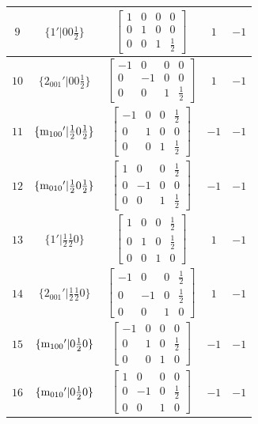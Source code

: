 \documentclass[fleqn,8pt]{jsarticle}
\begin{document}
\begin{longtable}{ccccc}
$ 9 $ & $ \{1{}'|0 0 \frac{1}{2}\} $ & $ \begin{bmatrix} 1 & 0 & 0 & 0 \\ 0 & 1 & 0 & 0 \\ 0 & 0 & 1 & \frac{1}{2} \end{bmatrix} $ & $ 1 $ & $ -1 $ \\ \hline
$ 10 $ & $ \{2{}_{001}{}'|0 0 \frac{1}{2}\} $ & $ \begin{bmatrix} -1 & 0 & 0 & 0 \\ 0 & -1 & 0 & 0 \\ 0 & 0 & 1 & \frac{1}{2} \end{bmatrix} $ & $ 1 $ & $ -1 $ \\ \hline
$ 11 $ & $ \{{\rm m}_{100}{}'|\frac{1}{2} 0 \frac{1}{2}\} $ & $ \begin{bmatrix} -1 & 0 & 0 & \frac{1}{2} \\ 0 & 1 & 0 & 0 \\ 0 & 0 & 1 & \frac{1}{2} \end{bmatrix} $ & $ -1 $ & $ -1 $ \\ \hline
$ 12 $ & $ \{{\rm m}_{010}{}'|\frac{1}{2} 0 \frac{1}{2}\} $ & $ \begin{bmatrix} 1 & 0 & 0 & \frac{1}{2} \\ 0 & -1 & 0 & 0 \\ 0 & 0 & 1 & \frac{1}{2} \end{bmatrix} $ & $ -1 $ & $ -1 $ \\ \hline
$ 13 $ & $ \{1{}'|\frac{1}{2} \frac{1}{2} 0\} $ & $ \begin{bmatrix} 1 & 0 & 0 & \frac{1}{2} \\ 0 & 1 & 0 & \frac{1}{2} \\ 0 & 0 & 1 & 0 \end{bmatrix} $ & $ 1 $ & $ -1 $ \\ \hline
$ 14 $ & $ \{2{}_{001}{}'|\frac{1}{2} \frac{1}{2} 0\} $ & $ \begin{bmatrix} -1 & 0 & 0 & \frac{1}{2} \\ 0 & -1 & 0 & \frac{1}{2} \\ 0 & 0 & 1 & 0 \end{bmatrix} $ & $ 1 $ & $ -1 $ \\ \hline
$ 15 $ & $ \{{\rm m}_{100}{}'|0 \frac{1}{2} 0\} $ & $ \begin{bmatrix} -1 & 0 & 0 & 0 \\ 0 & 1 & 0 & \frac{1}{2} \\ 0 & 0 & 1 & 0 \end{bmatrix} $ & $ -1 $ & $ -1 $ \\ \hline
$ 16 $ & $ \{{\rm m}_{010}{}'|0 \frac{1}{2} 0\} $ & $ \begin{bmatrix} 1 & 0 & 0 & 0 \\ 0 & -1 & 0 & \frac{1}{2} \\ 0 & 0 & 1 & 0 \end{bmatrix} $ & $ -1 $ & $ -1 $ \\
\end{longtable}
\end{document}
